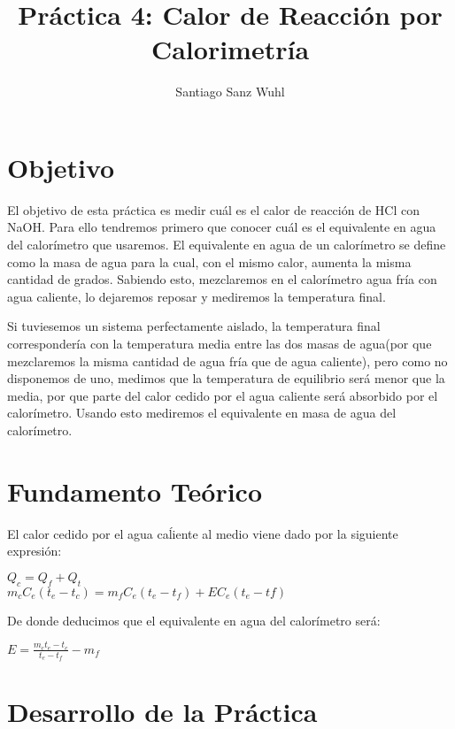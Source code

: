 \documentclass[11pt,a4paper]{article}
\author{Santiago Sanz Wuhl}
\title{Práctica 4: Calor de Reacción por Calorimetría}
\begin{document}
\maketitle
\section{Objetivo}
\quad El objetivo de esta práctica es medir cuál es el calor de reacción de HCl con NaOH. Para ello tendremos primero que conocer cuál es el equivalente en agua del calorímetro que usaremos. El equivalente en agua de un calorímetro se define como la masa de agua para la cual, con el mismo calor, aumenta la misma cantidad de grados. Sabiendo esto, mezclaremos en el calorímetro agua fría con agua caliente, lo dejaremos reposar y mediremos la temperatura final. 

Si tuviesemos un sistema perfectamente aislado, la temperatura final correspondería con la temperatura media entre las dos masas de agua(por que mezclaremos la misma cantidad de agua fría que de agua caliente), pero como no disponemos de uno, medimos que la temperatura de equilibrio será menor que la media, por que parte del calor cedido por el agua caliente será absorbido por el calorímetro. Usando esto mediremos el equivalente en masa de agua del calorímetro. 
\section{Fundamento Teórico}
\quad El calor cedido por el agua caĺiente al medio viene dado por la siguiente expresión:
\begin{center}
$Q_{c} = Q_{f} + Q_{t}$ \\
$m_{c}C_{e}(t_{e}-t_{c})=m_{f}C_{e}(t_{e}-t_{f})+EC_{e}(t_{e}-t{f})$ \\
\end{center}
De donde deducimos que el equivalente en agua del calorímetro será:
\begin{center}
$E = \frac{m_{c}t_{e}-t_{c}}{t_{e}-t_{f}} - m_{f}$
\end{center}
\section{Desarrollo de la Práctica}
\end{document}

